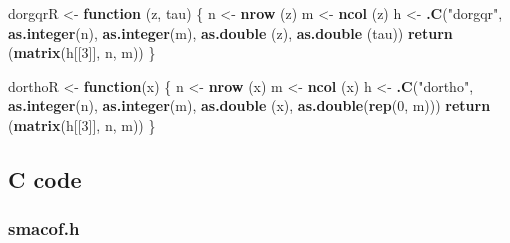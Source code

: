 \documentclass[12pt,]{article}
\newenvironment{Shaded}{\begin{snugshade}}{\end{snugshade}}
\newcommand{\KeywordTok}[1]{\textcolor[rgb]{0.13,0.29,0.53}{\textbf{#1}}}
\newcommand{\DecValTok}[1]{\textcolor[rgb]{0.00,0.00,0.81}{#1}}
\newcommand{\StringTok}[1]{\textcolor[rgb]{0.31,0.60,0.02}{#1}}
\newcommand{\ControlFlowTok}[1]{\textcolor[rgb]{0.13,0.29,0.53}{\textbf{#1}}}
\newcommand{\NormalTok}[1]{#1}
\begin{document}
\begin{Shaded}
\begin{Highlighting}[]
\NormalTok{dorgqrR <-}\StringTok{ }\ControlFlowTok{function}\NormalTok{ (z, tau) \{}
\NormalTok{  n <-}\StringTok{ }\KeywordTok{nrow}\NormalTok{ (z)}
\NormalTok{  m <-}\StringTok{ }\KeywordTok{ncol}\NormalTok{ (z)}
\NormalTok{  h <-}
\StringTok{    }\KeywordTok{.C}\NormalTok{(}\StringTok{"dorgqr"}\NormalTok{,}
       \KeywordTok{as.integer}\NormalTok{(n),}
       \KeywordTok{as.integer}\NormalTok{(m),}
       \KeywordTok{as.double}\NormalTok{ (z),}
       \KeywordTok{as.double}\NormalTok{ (tau))}
  \KeywordTok{return}\NormalTok{ (}\KeywordTok{matrix}\NormalTok{(h[[}\DecValTok{3}\NormalTok{]], n, m))}
\NormalTok{\}}

\NormalTok{dorthoR <-}\StringTok{ }\ControlFlowTok{function}\NormalTok{(x) \{}
\NormalTok{  n <-}\StringTok{ }\KeywordTok{nrow}\NormalTok{ (x)}
\NormalTok{  m <-}\StringTok{ }\KeywordTok{ncol}\NormalTok{ (x)}
\NormalTok{  h <-}
\StringTok{    }\KeywordTok{.C}\NormalTok{(}\StringTok{"dortho"}\NormalTok{,}
       \KeywordTok{as.integer}\NormalTok{(n),}
       \KeywordTok{as.integer}\NormalTok{(m),}
       \KeywordTok{as.double}\NormalTok{ (x),}
       \KeywordTok{as.double}\NormalTok{(}\KeywordTok{rep}\NormalTok{(}\DecValTok{0}\NormalTok{, m)))}
  \KeywordTok{return}\NormalTok{ (}\KeywordTok{matrix}\NormalTok{(h[[}\DecValTok{3}\NormalTok{]], n, m))}
\NormalTok{\}}
\end{Highlighting}
\end{Shaded}

\subsection{C code}\label{c-code}

\subsubsection{smacof.h}\label{smacof.h}
\end{document}
